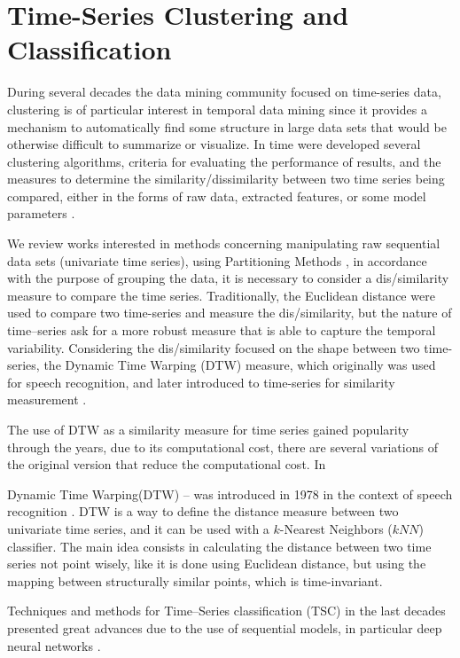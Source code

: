\section{Time-Series Clustering and Classification}
\label{Sec:ClusteringRelatedWorks}

During several decades the data mining community focused on time-series data, clustering is of particular interest in temporal data mining since it provides a mechanism to automatically find some structure in large data sets that would be otherwise difficult to summarize or visualize. In time were developed several clustering algorithms, criteria for evaluating the performance of results, and the measures to determine the similarity/dissimilarity between two time series being compared, either in the forms of raw data, extracted features, or some model parameters \cite{Liao2005, Aghabozorgi2015}.

We review works interested in methods concerning manipulating raw sequential data sets (univariate time series), using Partitioning Methods \cite{Kaufman2009}, in accordance with the purpose of grouping the data, it is necessary to consider a dis/similarity measure to compare the time series. Traditionally, the Euclidean distance were used to compare two time-series and measure the dis/similarity, but the nature of time--series ask for a more robust measure that is able to capture the temporal variability. Considering the dis/similarity focused on the shape between two time-series, the Dynamic Time Warping (DTW) measure, which originally was used for speech recognition, and later introduced to time-series for similarity measurement \cite{Sakoe1978}.

The use of DTW as a similarity measure for time series gained popularity through the years, due to its computational cost, there are several variations of the original version that reduce the computational cost. In 

Dynamic  Time  Warping(DTW) – was introduced in 1978 in the context of speech recognition \cite{Sakoe1978}. DTW is a way to define the distance measure between two univariate time series, and it can be used with a $k$-Nearest Neighbors ($kNN$) classifier. The main idea consists in calculating the distance between two time series not point wisely, like it is done using Euclidean distance, but using the mapping between structurally similar points, which is time-invariant.

Techniques and methods for Time--Series classification (TSC) in the last decades presented great advances due to the use of sequential models, in particular deep neural networks \cite{Fawaz2019}. 

